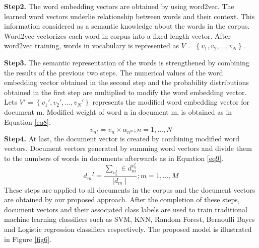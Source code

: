 \documentclass[a4paper,fleqn]{cas-dc}
\begin{document}
\textbf{Step2.} The word embedding vectors are obtained by using word2vec. The learned word vectors underlie relationship between words and their context. This information considered as a semantic knowledge about the words in the corpus. Word2vec vectorizes each word in corpus into a fixed length vector. 
After word2vec training, words in vocabulary is represented as
$V=\left\{v_1, v_2, ..., v_N\right\}$. 

\textbf{Step3.} The semantic representation of the words is strengthened by combining the results of the previous two steps. The numerical values of the word embedding vector obtained in the second step and the probability distributions obtained in the first step are multiplied to modify the word embedding vector. Lets $ V'=\left\{v_1' ,v_2', ..., v_N' \right\} $ represents the modified word embedding vector for document m. Modified weight of word n in document m, is obtained as in Equation \ref{eq8}. 
\begin{equation}
\label{eq8}
v_{n^I} = v_n\times\alpha_{n^m}; n=1,…,N
\end{equation}
\textbf{Step4.} At last, the document vector is created by combining  modified word vectors. Document vectors generated by summing word vectors and divide them to the numbers of words in documents afterwards as in Equation \ref{eq9}.
\begin{equation}
\label{eq9}
d_m{^I}=\frac{\sum_{v_n^I}\in d_m^{v_n^I}}{\mid d_m\mid};m=1,…,M
\end{equation}
These steps are applied to all documents in the corpus and the document vectors are obtained by our proposed approach. After the completion of these steps, document vectors and their associated class labels are used to train traditional machine learning classifiers such as SVM, KNN, Random Forest, Bernoulli Bayes and Logistic regression classifiers respectively. The proposed model is illustrated in Figure \ref{fig6}.
\end{document}
